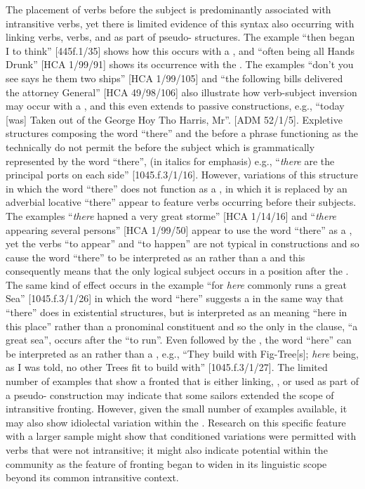 The placement of verbs before the subject is predominantly associated with intransitive verbs, yet there is limited evidence of this syntax also occurring with linking verbs,  verbs, and as part of pseudo- structures. The example “then began I to think” [445f.1/35] shows how this occurs with a , and “often being all Hands Drunk” [HCA 1/99/91] shows its occurrence with the . The examples “don’t you see says he them two ships” [HCA 1/99/105] and “the following bills delivered the attorney General” [HCA 49/98/106] also illustrate how verb-subject inversion may occur with a , and this even extends to passive constructions, e.g., “today [was] Taken out of the George Hoy Tho Harris, Mr”. [ADM 52/1/5]. Expletive structures composing the word “there” and the  before a  phrase functioning as the  technically do not permit the  before the subject which is grammatically represented by the word “there”, (in italics for emphasis) e.g., “\textit{there}\textbf{ }are the principal ports on each side” [1045.f.3/1/16]. However, variations of this structure in which the word “there” does not function as a , in which it is replaced by an adverbial locative “there” appear to feature verbs occurring before their  subjects. The examples “\textit{there} hapned a very great storme” [HCA 1/14/16] and “\textit{there} appearing several persons” [HCA 1/99/50] appear to use the word “there” as a , yet the verbs “to appear” and “to happen” are not typical in  constructions and so cause the word “there” to be interpreted as an  rather than a  and this consequently means that the only logical  subject occurs in a position after the .  The same kind of effect occurs in the example “for \textit{here} commonly runs a great Sea” [1045.f.3/1/26] in which the word “here” suggests a  in the same way that “there” does in existential structures, but is interpreted as an  meaning “here in this place” rather than a pronominal constituent and so the only  in the clause, “a great sea”, occurs after the  “to run”. Even followed by the , the word “here” can be interpreted as an  rather than a , e.g., “They build with Fig-Tree[s]; \textit{here} being, as I was told, no other Trees fit to build with” [1045.f.3/1/27]. The limited number of examples that show a fronted  that is either linking, , or used as part of a pseudo- construction may indicate that some sailors extended the scope of intransitive  fronting. However, given the small number of examples available, it may also show idiolectal variation within the .  Research on this specific feature with a larger sample might show that conditioned variations were permitted with verbs that were not intransitive; it might also indicate potential  within the community as the feature of  fronting began to widen in its linguistic scope beyond its common intransitive context. 

